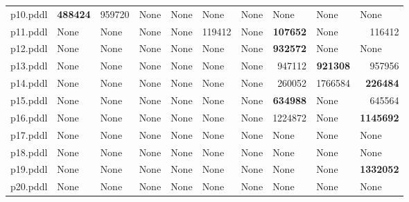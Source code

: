 \documentclass{article}
\begin{document}
\begin{tabular}{@{}lrrrrrrrrr@{}}
p10.pddl & \textbf{488424} & 959720 & \multicolumn{1}{|l|}{None} & \multicolumn{1}{|l|}{None} & \multicolumn{1}{|l|}{None} & \multicolumn{1}{|l|}{None} & \multicolumn{1}{|l|}{None} & \multicolumn{1}{|l|}{None} & \multicolumn{1}{|l|}{None} \\
p11.pddl & \multicolumn{1}{|l|}{None} & \multicolumn{1}{|l|}{None} & \multicolumn{1}{|l|}{None} & \multicolumn{1}{|l|}{None} & 119412 & \multicolumn{1}{|l|}{None} & \textbf{107652} & \multicolumn{1}{|l|}{None} & 116412 \\
p12.pddl & \multicolumn{1}{|l|}{None} & \multicolumn{1}{|l|}{None} & \multicolumn{1}{|l|}{None} & \multicolumn{1}{|l|}{None} & \multicolumn{1}{|l|}{None} & \multicolumn{1}{|l|}{None} & \textbf{932572} & \multicolumn{1}{|l|}{None} & \multicolumn{1}{|l|}{None} \\
p13.pddl & \multicolumn{1}{|l|}{None} & \multicolumn{1}{|l|}{None} & \multicolumn{1}{|l|}{None} & \multicolumn{1}{|l|}{None} & \multicolumn{1}{|l|}{None} & \multicolumn{1}{|l|}{None} & 947112 & \textbf{921308} & 957956 \\
p14.pddl & \multicolumn{1}{|l|}{None} & \multicolumn{1}{|l|}{None} & \multicolumn{1}{|l|}{None} & \multicolumn{1}{|l|}{None} & \multicolumn{1}{|l|}{None} & \multicolumn{1}{|l|}{None} & 260052 & 1766584 & \textbf{226484} \\
p15.pddl & \multicolumn{1}{|l|}{None} & \multicolumn{1}{|l|}{None} & \multicolumn{1}{|l|}{None} & \multicolumn{1}{|l|}{None} & \multicolumn{1}{|l|}{None} & \multicolumn{1}{|l|}{None} & \textbf{634988} & \multicolumn{1}{|l|}{None} & 645564 \\
p16.pddl & \multicolumn{1}{|l|}{None} & \multicolumn{1}{|l|}{None} & \multicolumn{1}{|l|}{None} & \multicolumn{1}{|l|}{None} & \multicolumn{1}{|l|}{None} & \multicolumn{1}{|l|}{None} & 1224872 & \multicolumn{1}{|l|}{None} & \textbf{1145692} \\
p17.pddl & \multicolumn{1}{|l|}{None} & \multicolumn{1}{|l|}{None} & \multicolumn{1}{|l|}{None} & \multicolumn{1}{|l|}{None} & \multicolumn{1}{|l|}{None} & \multicolumn{1}{|l|}{None} & \multicolumn{1}{|l|}{None} & \multicolumn{1}{|l|}{None} & \multicolumn{1}{|l|}{None} \\
p18.pddl & \multicolumn{1}{|l|}{None} & \multicolumn{1}{|l|}{None} & \multicolumn{1}{|l|}{None} & \multicolumn{1}{|l|}{None} & \multicolumn{1}{|l|}{None} & \multicolumn{1}{|l|}{None} & \multicolumn{1}{|l|}{None} & \multicolumn{1}{|l|}{None} & \multicolumn{1}{|l|}{None} \\
p19.pddl & \multicolumn{1}{|l|}{None} & \multicolumn{1}{|l|}{None} & \multicolumn{1}{|l|}{None} & \multicolumn{1}{|l|}{None} & \multicolumn{1}{|l|}{None} & \multicolumn{1}{|l|}{None} & \multicolumn{1}{|l|}{None} & \multicolumn{1}{|l|}{None} & \textbf{1332052} \\
p20.pddl & \multicolumn{1}{|l|}{None} & \multicolumn{1}{|l|}{None} & \multicolumn{1}{|l|}{None} & \multicolumn{1}{|l|}{None} & \multicolumn{1}{|l|}{None} & \multicolumn{1}{|l|}{None} & \multicolumn{1}{|l|}{None} & \multicolumn{1}{|l|}{None} & \multicolumn{1}{|l|}{None} \\
\end{tabular}
\end{document}
